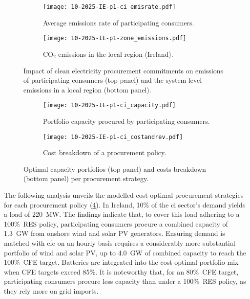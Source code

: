 \documentclass[11pt, 5p, nopreprintline]{elsarticle}
\begin{document}
\begin{figure}[t]
    \centering
    \begin{subfigure}[t]{0.95\columnwidth}
        \centering
        \caption{Average emissions rate of participating consumers.}
        \texttt{[image: 10-2025-IE-p1-ci\_emisrate.pdf]}
        \label{fig:10-2025-IE-p1-ci_emisrate}
    \end{subfigure}
    \begin{subfigure}[t]{0.95\columnwidth}
        \centering
        \vspace{-0.2cm}
        \caption{CO$_2$ emissions in the local region (Ireland).}
        \texttt{[image: 10-2025-IE-p1-zone\_emissions.pdf]}
        \label{fig:10-2025-IE-p1-zone_emissions}
    \end{subfigure}
    \caption{Impact of clean electricity procurement commitments on emissions of participating consumers (top panel) and the system-level emissions in a local region (bottom panel).}
    \label{fig:10-2025-IE-p1-emissions}
\end{figure}

\begin{figure}[t]
    \centering
    \begin{subfigure}[t]{0.95\columnwidth}
        \centering
        \caption{Portfolio capacity procured by participating consumers.}
        \texttt{[image: 10-2025-IE-p1-ci\_capacity.pdf]}
        \label{fig:10-2025-IE-p1-ci_capacity}
    \end{subfigure}
    \begin{subfigure}[t]{0.95\columnwidth}
        \centering
        \vspace{-0.2cm}
        \caption{Cost breakdown of a procurement policy.}
        \texttt{[image: 10-2025-IE-p1-ci\_costandrev.pdf]}
        \label{fig:10-2025-IE-p1-ci_costandrev}
    \end{subfigure}
    \caption{Optimal capacity portfolios (top panel) and costs breakdown (bottom panel) per procurement strategy.}
    \label{fig:10-2025-IE-p1-ci_procurement}
\end{figure}

The following analysis unveils the modelled cost-optimal procurement strategies for each procurement policy (\cref{fig:10-2025-IE-p1-ci_capacity}).
In Ireland, 10\% of the \gls{ci} sector's demand yields a load of 220~MW.
The findings indicate that, to cover this load adhering to a 100\%~RES policy, participating consumers procure a combined capacity of 1.3~GW from onshore wind and solar PV generators.
Ensuring demand is matched with \gls{cfe} on an hourly basis requires a considerably more substantial portfolio of wind and solar PV, up to 4.0~GW of combined capacity to reach the 100\%~CFE target.
Batteries are integrated into the cost-optimal portfolio mix when CFE targets exceed 85\%.
It is noteworthy that, for an 80\%~CFE target, participating consumers procure less capacity than under a 100\%~RES policy, as they rely more on grid imports.
\end{document}
